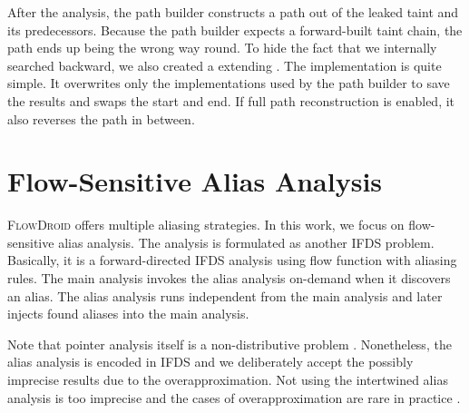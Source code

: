 \documentclass[../draft.tex]{subfiles}
\begin{document}
    After the analysis, the path builder constructs a path out of the leaked taint and its predecessors. 
    Because the path builder expects a forward-built taint chain, the path ends up being the wrong way round. 
    To hide the fact that we internally searched backward, we also created a  extending . 
    The implementation is quite simple. 
    It overwrites only the  implementations used by the path builder to save the results and swaps the start and end. 
    If full path reconstruction is enabled, it also reverses the path in between.

    \section{Flow-Sensitive Alias Analysis}\label{s:aliasing}
    \textsc{FlowDroid} offers multiple aliasing strategies.
    In this work, we focus on flow-sensitive alias analysis. 
    The analysis is formulated as another IFDS problem. 
    Basically, it is a forward-directed IFDS analysis using flow function with aliasing rules. 
    The main analysis invokes the alias analysis on-demand when it discovers an alias.
    The alias analysis runs independent from the main analysis and later injects found aliases into the main analysis.

    Note that pointer analysis itself is a non-distributive problem \cite{Arzt2017PhD, Spaeth2016}. 
    Nonetheless, the alias analysis is encoded in IFDS and we deliberately accept the possibly imprecise results due to the overapproximation. 
    Not using the intertwined alias analysis is too imprecise and the cases of overapproximation are rare in practice \cite{Arzt2017PhD}.
\end{document}
